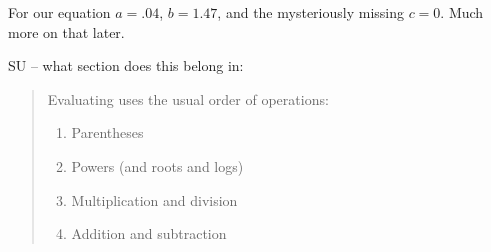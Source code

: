 \bigskip
\bigskip

\noindent For our equation $a=.04$, $b=1.47$, and the mysteriously missing $c=0$.  Much more on that later.  


SU -- what section does this belong in:

\begin{quote}
Evaluating uses the usual order of operations:
\begin{enumerate}
\item Parentheses
\item Powers (and roots and logs)
\item Multiplication and division
\item Addition and subtraction
\end{enumerate}
\end{quote}%


%